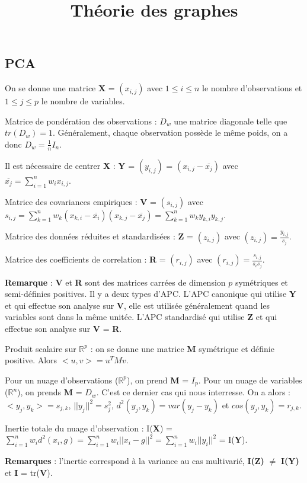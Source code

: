 \documentclass[5pt,a4paper]{article}
\title{Théorie des graphes}
\date{}
\begin{document}
\subsection*{PCA}
On se donne une matrice \textbf{X} = $(x_{i,j})$ avec $1 \le i \le n$ le nombre d'observations et $1 \le j \le p$ le nombre de variables.

Matrice de pondération des observations : $D_w$ une matrice diagonale telle que $tr(D_w) = 1$. Généralement, chaque observation possède le même poids, on a donc $D_w = \frac{1}{n}I_n$.

Il est nécessaire de centrer \textbf{X} : \textbf{Y} = $(y_{i,j})$ = $(x_{i,j} - \overline{x_j})$ avec $\overline{x_j} = \sum_{i=1}^n w_i x_{i,j}$.

Matrice des covariances empiriques : \textbf{V} = $(s_{i,j})$ avec $s_{i,j} = \sum_{k=1}^n w_k (x_{k,i} - \overline{x_i})(x_{k,j} - \overline{x_j}) = \sum_{k=1}^n w_k y_{k,i} y_{k,j}$.

Matrice des données réduites et standardisées : \textbf{Z} = $(z_{i,j})$ avec $(z_{i,j}) = \frac{y_{i,j}}{s_j}$.

Matrice des coefficients de correlation : \textbf{R} = $(r_{i,j})$ avec $(r_{i,j}) = \frac{s_{i,j}}{s_is_j}$.

\textbf{Remarque} : \textbf{V} et \textbf{R} sont des matrices carrées de dimension $p$ symétriques et semi-définies positives. Il y a deux types d'APC. L'APC canonique qui utilise \textbf{Y} et qui effectue son analyse sur \textbf{V}, elle est utilisée généralement quand les variables sont dans la même unitée. L'APC standardisé qui utilise \textbf{Z} et qui effectue son analyse sur \textbf{V} = \textbf{R}.

Produit scalaire sur $\mathbb{R}^p$ : on se donne une matrice \textbf{M} symétrique et définie positive. Alors $<u,v> = u^TMv$.

Pour un nuage d'observations ($\mathbb{R}^p$), on prend \textbf{M} = $I_p$. Pour un nuage de variables ($\mathbb{R}^n$), on prends \textbf{M} = $D_w$. C'est ce dernier cas qui nous interresse. On a alors : $<y_j,y_k> = s_{j,k}$, $||y_j||^2 = s_j^2$, $d^2(y_j,y_k) = var(y_j-y_k)$ et $cos(y_j,y_k) = r_{j,k}$.

Inertie totale du nuage d'observation : I(\textbf{X}) = $\sum_{i=1}^n w_i d^2(x_i,g) = \sum_{i=1}^n w_i ||x_i-g||^2 = \sum_{i=1}^n w_i ||y_i||^2$ = I(\textbf{Y}).

\textbf{Remarques} : l'inertie correspond à la variance au cas multivarié, \textbf{I(Z)} $\neq$ \textbf{I(Y)} et \textbf{I} = tr(\textbf{V}).
\end{document}
